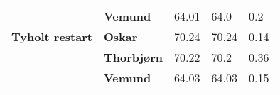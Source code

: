 \begin{table}[]
\begin{tabular}{lllll}
                                        & \textbf{Vemund}                      & 64.01                             & 64.0                               & 0.2                                 \\
\rowcolor[HTML]{C0C0C0} 
\textbf{Tyholt restart}                 & \textbf{Oskar}                       & 70.24                             & 70.24                              & 0.14                                \\
\rowcolor[HTML]{C0C0C0} 
                                        & \textbf{Thorbjørn}                   & 70.22                             & 70.2                               & 0.36                                \\
\rowcolor[HTML]{C0C0C0} 
                                        & \textbf{Vemund}                      & 64.03                             & 64.03                              & 0.15                               
\end{tabular}
\end{table}